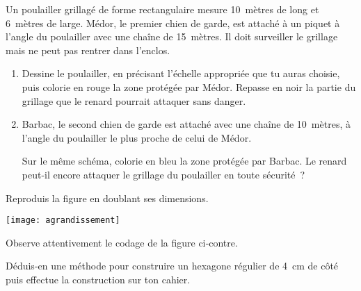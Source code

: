 \begin{exercice}
Un poulailler grillagé de forme rectangulaire mesure 10 mètres de long et 6 mètres de large. Médor, le premier chien de garde, est attaché à un piquet à l'angle du poulailler avec une chaîne de 15 mètres. Il doit surveiller le grillage mais ne peut pas rentrer dans l'enclos. 
\begin{enumerate}
 \item Dessine le poulailler, en précisant l'échelle appropriée que tu auras choisie, puis colorie en rouge la zone protégée par Médor. Repasse en noir la partie du grillage que le renard pourrait attaquer sans danger.
 \item Barbac, le second chien de garde est attaché avec une chaîne de 10 mètres, à l'angle du poulailler le plus proche de celui de Médor.
 
Sur le même schéma, colorie en bleu la zone protégée par Barbac. Le renard peut-il encore attaquer le grillage du poulailler en toute sécurité ?
 \end{enumerate}
\end{exercice}


\begin{exercice}[Agrandissement]
Reproduis la figure en doublant ses dimensions.
\begin{center} \texttt{[image: agrandissement]} \end{center}
\end{exercice}


\begin{exercice}

\vspace{1em}

\begin{minipage}[c]{0.50\linewidth}
Observe attentivement le codage de la figure ci‑contre. 

Déduis-en une méthode pour construire un hexagone régulier de 4 cm de côté puis effectue la construction sur ton cahier.
 \end{minipage} \hfill%
 \begin{minipage}[c]{0.46\linewidth}
  \begin{center}
 \end{center}
  \end{minipage} \\
\end{exercice}


